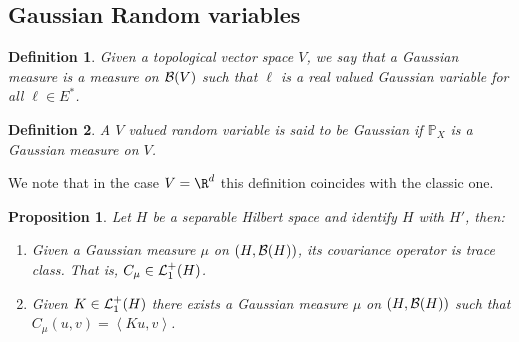 \documentclass[12pt]{article}
\newtheorem{proposition}{Proposition}
\newtheorem{definition}{Definition}
\newcommand{\br}[1]{\left\langle#1\right\rangle}
\begin{document}
\subsection{Gaussian Random variables}
\begin{definition}
    Given a topological vector space $V$, we say that a \emph{Gaussian measure } is a measure on $\mathcal{B}(V)$ such that $\ell $ is a real valued Gaussian variable for all $\ell \in E^*$.
\end{definition}
\begin{definition}
    A $V$ valued random variable is said to be Gaussian if $\mathbb{P}_X$ is a Gaussian measure on $V$.
\end{definition}
We note that in the case $V=\R^d$ this definition coincides with the classic one.
\begin{proposition}\label{covarianceariance kernel gaussian} Let $H$ be a separable Hilbert space and identify  $H$ with $H'$, then:
    \begin{enumerate}
        \item Given a Gaussian measure $\mu $ on  $(H,\mathcal{B}(H))$, its covariance operator is trace class. That is, $C_\mu \in \mathcal{L}_1^+(H)$.
        \item Given $K\in \mathcal{L}_1^+(H)$ there exists a Gaussian measure $\mu $ on $(H,\mathcal{B}(H))$ such that $C_\mu(u,v)=\br{Ku ,v}$.
    \end{enumerate}
\end{proposition}
\end{document}
